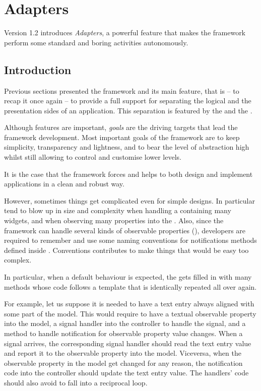 \section {Adapters}
\label{ADAPT}

Version 1.2 introduces \emph{Adapters}, a powerful feature that
makes the framework perform some standard and boring activities
autonomously.

\subsection{Introduction}

Previous sections presented the framework and its main feature, that
is -- to recap it once again -- to provide a full support for
separating the logical and the presentation sides of an
application. This separation is featured by the \mvc and the \obs.

Although features are important, \emph{goals} are the driving
targets that lead the framework development. Most important goals of
the framework are to keep simplicity, transparency and lightness,
and to bear the level of abstraction high whilst still allowing to
control and customise lower levels.

It is the case that the framework forces and helps to both design
and implement applications in a clean and robust way. 

However, sometimes things get complicated even for simple
designs. In particular  tend to blow up in size and
complexity when handling a  containing many widgets, and
when observing many properties into the . Also, since the
framework can handle several kinds of observable properties (\OPS),
developers are required to remember and use some naming conventions
for notifications methods defined inside . Conventions
contributes to make things that would be easy too complex.

In particular, when a default behaviour is expected, the
 gets filled in with many methods whose code follows
a template that is identically repeated all over again.

\bigskip 

For example, let us suppose it is needed to have a text entry always
aligned with some part of the model. This would require to have a
textual observable property into the model, a signal handler into
the controller to handle the  signal, and a
method to handle notification for observable property value
changes. When a  signal arrives, the
corresponding signal handler should read the text entry value and
report it to the observable property into the model. Viceversa, when
the observable property in the model get changed for any reason, the
notification code into the controller should update the text entry
value. The handlers' code should also avoid to fall into a
reciprocal loop.

